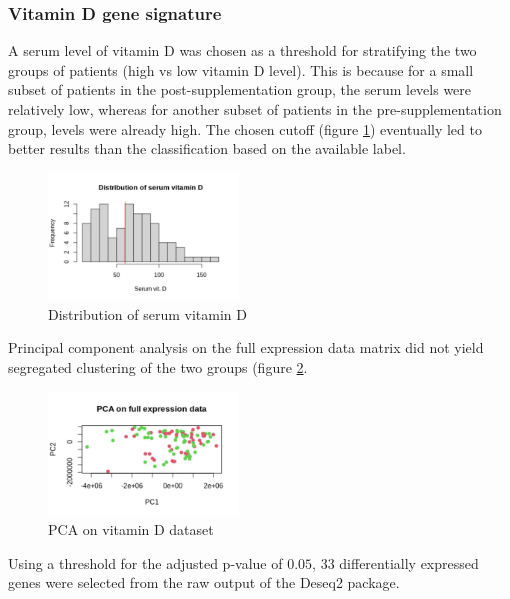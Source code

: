\documentclass[fleqn,10pt]{SelfArx} %
\begin{document}
		\subsubsection{Vitamin D gene signature}
		A serum level of vitamin D was chosen as a threshold for stratifying the two groups of patients (high vs low vitamin D level). This is because for a small subset of patients in the post-supplementation group, the serum levels were relatively low, whereas for another subset of patients in the pre-supplementation group, levels were already high. The chosen cutoff (figure \ref{fig:serum_level}) eventually led to better results than the classification based on the available label.

		\begin{figure}[ht]
			\includegraphics[width=0.45\textwidth]{figures/serum_level.png}
			\caption{Distribution of serum vitamin D}
			\label{fig:serum_level}
		\end{figure}

		Principal component analysis on the full expression data matrix did not yield segregated clustering of the two groups (figure \ref{fig:pca_vit_d}.

		\begin{figure}[ht]
			\includegraphics[width=0.45\textwidth]{figures/vit_d_pca.png}
			\caption{PCA on vitamin D dataset}
			\label{fig:pca_vit_d}
		\end{figure}

		Using a threshold for the adjusted p-value of $0.05$, $33$ differentially expressed genes were selected from the raw output of the Deseq2 package.
\end{document}
